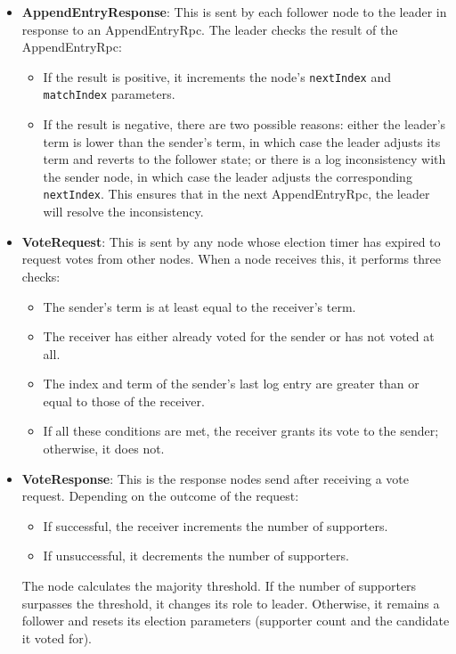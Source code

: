 \begin{itemize}
  \item \textbf{AppendEntryResponse}: This is sent by each follower node to the leader 
    in response to an AppendEntryRpc. The leader checks the result of the AppendEntryRpc:
    \begin{itemize}
      \item If the result is positive, it increments the node’s \texttt{nextIndex} and \texttt{matchIndex} parameters.
     \item If the result is negative, there are two possible reasons: either the leader’s 
       term is lower than the sender’s term, in which case the leader adjusts its term and 
        reverts to the follower state; or there is a log inconsistency with the sender node, 
        in which case the leader adjusts the corresponding \texttt{nextIndex}. This ensures that in the 
        next AppendEntryRpc, the leader will resolve the inconsistency.
    \end{itemize}

  \item \textbf{VoteRequest}: This is sent by any node whose election timer has expired to request votes 
    from other nodes. When a node receives this, it performs three checks:
    \begin{itemize}
      \item The sender’s term is at least equal to the receiver’s term.
      \item The receiver has either already voted for the sender or has not voted at all.
      \item The index and term of the sender’s last log entry are greater than or equal to those of the receiver.
      \item If all these conditions are met, the receiver grants its vote to the sender; otherwise, it does not.
    \end{itemize}

  \item \textbf{VoteResponse}: This is the response nodes send after receiving a vote request. 
      Depending on the outcome of the request:
      \begin{itemize}
        \item If successful, the receiver increments the number of supporters.
        \item If unsuccessful, it decrements the number of supporters.
      \end{itemize}
      The node calculates the majority threshold. If the number of supporters surpasses 
      the threshold, it changes its role to leader. Otherwise, it remains a follower and 
      resets its election parameters (supporter count and the candidate it voted for).


\end{itemize}
